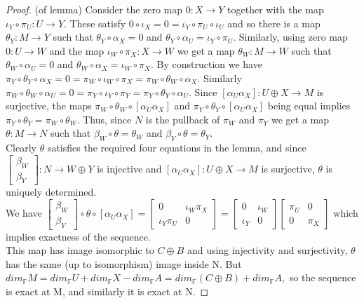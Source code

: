 \documentclass{book}
\begin{document}
\begin{proof}(of lemma) Consider the zero map $0:X \rightarrow Y$ together with the map $\iota_Y \circ \pi_U : U \rightarrow Y$. These satisfy $0\circ \iota_X = 0 = \iota_Y \circ \pi_U \circ \iota_U$ and so there is a map $\theta_Y:M\rightarrow Y $ such that $\theta_Y \circ \alpha_X = 0$ and $\theta_Y \circ \alpha_U = \iota_Y \circ \pi_U$. Similarly, using zero map $0:U \rightarrow W$ and the map $\iota_W \circ \pi_X :X \rightarrow W$ we get a map $\theta_W :M \rightarrow W$ such that $\theta_W \circ \alpha_U =0$ and $\theta_W \circ \alpha_X = \iota_W \circ \pi_X$. By construction we have $\pi_Y \circ \theta_Y \circ \alpha_X = 0 = \pi_W \circ \iota_W \circ \pi_X = \pi_W \circ \theta_W \circ \alpha_X.$ Similarly $\pi_W \circ \theta_W \circ \alpha_U = 0 = \pi_Y \circ \iota_Y \circ \pi_Y = \pi_Y \circ \theta_Y \circ \alpha_U.$ Since $[\alpha_U \alpha_X] : U \oplus X \rightarrow M$ is surjective, the maps $\pi_W \circ \theta_W \circ [\alpha_U \alpha_X]$ and $\pi_Y \circ \theta_Y \circ [\alpha_U \alpha_X]$ being equal implies $\pi_Y \circ \theta_Y = \pi_W \circ \theta_W$. Thus, since $N$ is the pullback of $\pi_W$ and $\pi_Y$ we get a map $\theta : M\rightarrow N$ such that $\beta_W \circ \theta = \theta_W$ and  $\beta_Y \circ \theta = \theta_Y$. \\
Clearly $\theta$ satisfies the required four equations in the lemma, and since $\begin{bmatrix} \beta_W \\ \beta_Y \end{bmatrix}:N \rightarrow W\oplus Y$ is injective and $[\alpha_U \alpha_X] : U \oplus X \rightarrow M$ is surjective, $\theta$ is uniquely determined. \\
We have $\begin{bmatrix} \beta_W \\ \beta_Y \end{bmatrix} \circ \theta \circ [\alpha_U \alpha_X] = \begin{bmatrix} 0 &  \iota_W \pi_X \\ \iota_Y \pi_U & 0 \end{bmatrix} = \begin{bmatrix} 0 &  \iota_W \\ \iota_Y  & 0 \end{bmatrix}  \begin{bmatrix}\pi_U &0 \\ 0 & \pi_X \end{bmatrix} $ which implies exactness of the sequence.\\
This map has image isomorphic to $C\oplus B$ and using injectivity and surjectivity, $\theta$ has the same (up to isomorphism) image inside N. But $dim_\mathbb{F}M =dim_\mathbb{F}U +dim_\mathbb{F}X -dim_\mathbb{F}A =dim_\mathbb{F}(C\oplus B)+dim_\mathbb{F}A,$ so the sequence is exact at M, and similarly it is exact at N.
\end{proof}
\end{document}

